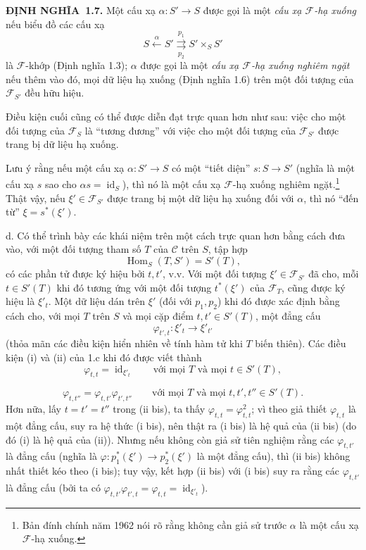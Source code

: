 \documentclass[11pt,twoside,openany]{book}
\numberwithin{equation}{section}
\newcommand{\src}[1]{%
  \phantomsection\hypertarget{src:\fgasourceid:#1}{}%
  \marginpar{\raggedleft\footnotesize\sffamily #1}%
}
\newcommand{\fgasourceid}{unset}
\newcommand{\result}[2]{\par\medskip\noindent\textbf{#1\if\relax\detokenize{#2}\relax\else\ #2\fi.}\quad}
\begin{document}
\result{ĐỊNH NGHĨA}{1.7} Một cấu xạ $\alpha:S'\longrightarrow S$ được gọi là
một \emph{cấu xạ $\mathcal F$-hạ xuống} nếu biểu đồ các cấu xạ
\[
  S\xleftarrow{\alpha}S'
  \overset{p_1}{\underset{p_2}{\rightrightarrows}}S'\times_S S'
\]
là $\mathcal F$-khớp (Định nghĩa 1.3); $\alpha$ được gọi là một
\emph{cấu xạ $\mathcal F$-hạ xuống nghiêm ngặt} nếu thêm vào đó, mọi dữ liệu hạ
xuống (Định nghĩa 1.6) trên một đối tượng của $\mathcal F_{S'}$ đều hữu hiệu.

Điều kiện cuối cũng có thể được diễn đạt trực quan hơn như sau: việc cho một
đối tượng của $\mathcal F_S$ là ``tương đương'' với việc cho một đối tượng của
$\mathcal F_{S'}$ được trang bị dữ liệu hạ xuống.

Lưu ý rằng nếu một cấu xạ $\alpha:S'\longrightarrow S$ có một ``tiết diện''
$s:S\longrightarrow S'$ (nghĩa là một cấu xạ $s$ sao cho
$\alpha s=\operatorname{id}_S$), thì nó là một cấu xạ
$\mathcal F$-hạ xuống nghiêm ngặt.\footnote{Bản đính chính năm 1962 nói rõ rằng
không cần giả sử trước $\alpha$ là một cấu xạ $\mathcal F$-hạ xuống.} Thật vậy,
nếu $\xi'\in\mathcal F_{S'}$ được trang bị một dữ liệu hạ xuống đối với
$\alpha$, thì nó ``đến từ'' $\xi=s^*(\xi')$.

\medskip\noindent
d. Có thể trình bày các khái niệm trên một cách trực quan hơn bằng cách đưa vào,
với một đối tượng tham số $T$ của $\mathcal C$ trên $S$, tập hợp
\[
  \operatorname{Hom}_S(T,S')=S'(T),
\]
có các phần tử được ký hiệu bởi $t,t'$, v.v. Với một đối tượng
$\xi'\in\mathcal F_{S'}$ đã cho, mỗi $t\in S'(T)$ khi đó tương ứng với một đối
tượng $t^*(\xi')$ của $\mathcal F_T$, cũng được ký hiệu là $\xi'_t$. Một dữ
liệu dán trên $\xi'$ (đối với $p_1,p_2$) khi đó được xác định bằng cách cho,
với mọi $T$ trên $S$ và mọi cặp điểm $t,t'\in S'(T)$, một đẳng cấu
\[
  \varphi_{t',t}:\xi'_t\longrightarrow\xi'_{t'}
\]
(thỏa mãn các điều kiện hiển nhiên về tính hàm tử khi $T$ biến thiên). Các điều
kiện (i) và (ii) của 1.c khi đó được viết thành
\[
  \tag{i bis}
  \varphi_{t,t}=\operatorname{id}_{\xi'_t}
  \qquad\text{với mọi $T$ và mọi $t\in S'(T)$},
\]

\src{304}
\[
  \tag{ii bis}
  \varphi_{t,t''}=\varphi_{t,t'}\varphi_{t',t''}
  \qquad\text{với mọi $T$ và mọi $t,t',t''\in S'(T)$}.
\]
Hơn nữa, lấy $t=t'=t''$ trong (ii bis), ta thấy
$\varphi_{t,t}=\varphi_{t,t}^2$; vì theo giả thiết $\varphi_{t,t}$ là một đẳng
cấu, suy ra hệ thức (i bis), nên thật ra (i bis) là hệ quả của (ii bis) (do đó
(i) là hệ quả của (ii)). Nhưng nếu không còn giả sử tiên nghiệm rằng các
$\varphi_{t,t'}$ là đẳng cấu (nghĩa là
$\varphi:p_1^*(\xi')\longrightarrow p_2^*(\xi')$ là một đẳng cấu), thì (ii bis)
không nhất thiết kéo theo (i bis); tuy vậy, kết hợp (ii bis) với (i bis) suy ra
rằng các $\varphi_{t,t'}$ là đẳng cấu (bởi ta có
$\varphi_{t,t'}\varphi_{t',t}=\varphi_{t,t}=\operatorname{id}_{\xi'_t}$).
\end{document}
